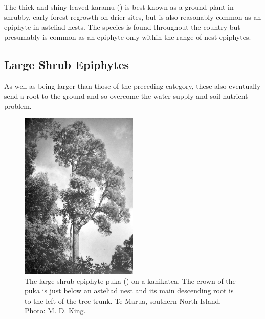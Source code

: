 The thick and shiny-leaved karamu () is best known as a ground plant in shrubby, early forest regrowth on drier sites, but is also reasonably common as an epiphyte in asteliad nests.
The species is found throughout the country but presumably is common as an epiphyte only within the range of nest epiphytes.

\subsection{Large Shrub Epiphytes}

As well as being larger than those of the preceding category, these also eventually send a root to the ground and so overcome the water supply and soil nutrient problem.

\begin{figure}
	\includegraphics[width=0.5\textwidth]{graphics/figure45puka.jpg}
	\centering
	\caption[The large shrub epiphyte puka]{The large shrub epiphyte puka () on a kahikatea.
    The crown of the puka is just below an asteliad nest and its main descending root is to the left of the tree trunk.
    Te Marua, southern North Island.
	Photo: M. D. King.}
	\label{fig:45puka}
\end{figure}

